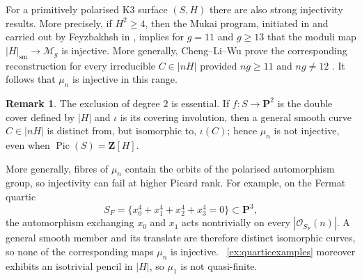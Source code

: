 \documentclass[a4paper,12pt,twoside,reqno]{amsart}
\makeatletter
\numberwithin{equation}{section}
\def\cr@pref#1:#2\@nil{#1}
\newcommand{\cr@tsing}[1]{\@nameuse{cr@map@\cr@pref#1:\@nil}}
\newcommand{\Cref}[1]{\cr@tsing{#1}~\ref{#1}}
\theoremstyle{plain}
\theoremstyle{definition}
\newtheorem{remark}[theorem]{Remark}
\DeclareMathOperator{\Pic}{Pic}
\newcommand{\PP}{\mathbf{P}}
\newcommand{\ZZ}{\mathbf{Z}}
\newcommand{\Oc}{\mathscr{O}}
\newcommand{\sm}{\mathrm{sm}}
\theoremstyle{plain}
\theoremstyle{definition}
\makeatother
\begin{document}
For a primitively polarised K3 surface $(S,H)$ there are also strong injectivity results. More precisely, if $H^2 \geq 4$, then the
Mukai program, initiated in \cite{mukai} and carried out by Feyzbakhsh in \cite{FeyzbakhshI,FeyzbakhshII}, implies for $g=11$ and $g\geq13$ that the moduli map $|H|_{\sm} \rightarrow \mathcal{M}_g$ is injective. More generally, Cheng--Li--Wu prove the corresponding reconstruction for every irreducible $C\in|nH|$ provided $ng\geq11$ and $ng\neq12$ \cite[Theorem~1.1]{CLW}. It follows that $\mu_n$ is injective in this range.





\begin{remark}
The exclusion of degree $2$ is essential. If $f\colon S\to\PP^2$ is the double cover defined by $|H|$ and $\iota$ is its covering involution, then a general smooth curve $C\in|nH|$ is distinct from, but isomorphic to, $\iota(C)$; hence $\mu_n$ is not injective, even when $\Pic(S)=\ZZ[H]$.

More generally, fibres of $\mu_n$ contain the orbits of the polarised automorphism group, so injectivity can fail at higher Picard rank. For example, on the Fermat quartic
\[
   S_F=\{x_0^4+x_1^4+x_2^4+x_3^4=0\}\subset\PP^3,
\]
the automorphism exchanging $x_0$ and $x_1$ acts nontrivially on every $|\Oc_{S_F}(n)|$. A general smooth member and its translate are therefore distinct isomorphic curves, so none of the corresponding maps $\mu_n$ is injective.
\Cref{ex:quarticexamples} moreover exhibits an isotrivial pencil in
$|H|$, so $\mu_1$ is not quasi-finite.
\end{remark}
\end{document}
